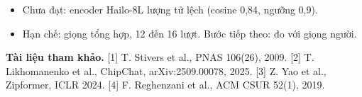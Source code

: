 \documentclass{article}
\begin{document}
\begin{minipage}[t][\textheight][t]{\textwidth}
\begin{cotk}{\rong}{\cao}
{\begin{itemize}[itemsep=2pt]
\item Chưa đạt: encoder Hailo-8L lượng tử lệch (cosine 0,84, ngưỡng 0,9).
\item Hạn chế: giọng tổng hợp, 12 đến 16 lượt. Bước tiếp theo: đo với giọng người.
\end{itemize}\par}
\vspace{3pt}
{\fontsize{12.5}{15}\selectfont\color{black!75}\textbf{Tài liệu tham khảo.} [1] T. Stivers et al., PNAS 106(26), 2009. [2] T. Likhomanenko et al., ChipChat, arXiv:2509.00078, 2025. [3] Z. Yao et al., Zipformer, ICLR 2024. [4] F. Reghenzani et al., ACM CSUR 52(1), 2019.\par}
\end{cotk}
\end{minipage}
\end{document}
